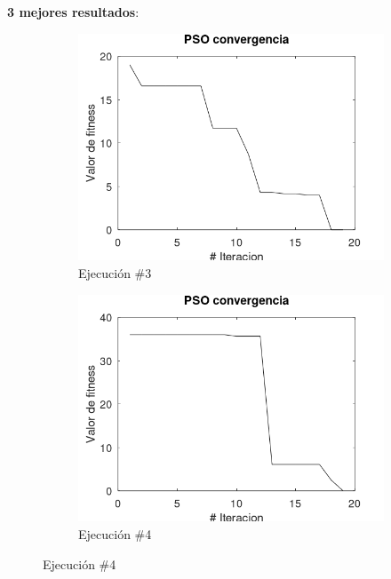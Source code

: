 \documentclass[12pt, a4paper]{article}
\begin{document}
        \textbf{3 mejores resultados}:

        \begin{figure}[H]
             \centering
             \begin{subfigure}[b]{0.3\textwidth}
                 \centering
                 \includegraphics[width=\textwidth]{img/pso4.png}
                 \caption{Ejecución \#3}
                 \label{fig:pso4}
             \end{subfigure}
             \hfill
             \begin{subfigure}[b]{0.3\textwidth}
                 \centering
                 \includegraphics[width=\textwidth]{img/pso5.png}
                 \caption{Ejecución \#4}
                 \label{fig:pso5}

\end{subfigure}
\end{figure}
\end{document}
